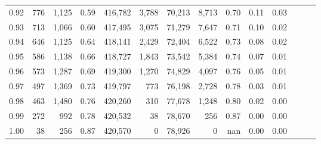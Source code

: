 \begin{tabular}{rrrrrrrrrrrrrr}
0.92 &    776 &  1,125 &  0.59 &  416,782 &    3,788 &  70,213 &   8,713 &  0.70 &  0.11 &      0.03 \\
0.93 &    713 &  1,066 &  0.60 &  417,495 &    3,075 &  71,279 &   7,647 &  0.71 &  0.10 &      0.02 \\
0.94 &    646 &  1,125 &  0.64 &  418,141 &    2,429 &  72,404 &   6,522 &  0.73 &  0.08 &      0.02 \\
0.95 &    586 &  1,138 &  0.66 &  418,727 &    1,843 &  73,542 &   5,384 &  0.74 &  0.07 &      0.01 \\
0.96 &    573 &  1,287 &  0.69 &  419,300 &    1,270 &  74,829 &   4,097 &  0.76 &  0.05 &      0.01 \\
0.97 &    497 &  1,369 &  0.73 &  419,797 &      773 &  76,198 &   2,728 &  0.78 &  0.03 &      0.01 \\
0.98 &    463 &  1,480 &  0.76 &  420,260 &      310 &  77,678 &   1,248 &  0.80 &  0.02 &      0.00 \\
0.99 &    272 &    992 &  0.78 &  420,532 &       38 &  78,670 &     256 &  0.87 &  0.00 &      0.00 \\
1.00 &     38 &    256 &  0.87 &  420,570 &        0 &  78,926 &       0 &   nan &  0.00 &      0.00 \\
\bottomrule
\end{tabular}
